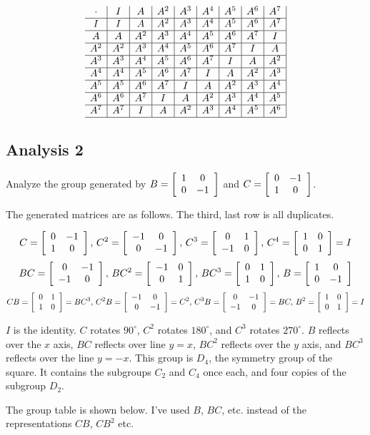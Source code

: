 \documentclass[../gatm.tex]{subfiles}
\begin{document}
$$\begin{array}{c|c|c|c|c|c|c|c|c|}
\cdot & I & A & A^2 & A^3 & A^4 & A^5 & A^6 & A^7 \\ \hline
I & I & A & A^2 & A^3 & A^4 & A^5 & A^6 & A^7 \\ \hline
A & A & A^2 & A^3 & A^4 & A^5 & A^6 & A^7 & I \\ \hline
A^2 & A^2 & A^3 & A^4 & A^5 & A^6 & A^7 & I & A \\ \hline
A^3 & A^3 & A^4 & A^5 & A^6 & A^7 & I & A & A^2 \\ \hline
A^4 & A^4 & A^5 & A^6 & A^7 & I & A & A^2 & A^3 \\ \hline
A^5 & A^5 & A^6 & A^7 & I & A & A^2 & A^3 & A^4 \\ \hline
A^6 & A^6 & A^7 & I & A & A^2 & A^3 & A^4 & A^5 \\ \hline
A^7 & A^7 & I & A & A^2 & A^3 & A^4 & A^5 & A^6 \\ \hline
\end{array}$$

\subsection*{Analysis 2}

Analyze the group generated by $B=\left[\begin{array}{cc} 1 & 0 \\ 0 & -1 \end{array}\right]$ and $C=\left[\begin{array}{cc} 0 & -1 \\ 1 & 0 \end{array}\right]$.

The generated matrices are as follows. The third, last row is all duplicates.

$$C=\left[\begin{array}{cc} 0 & -1 \\ 1 & 0 \end{array}\right],\, C^2=\left[\begin{array}{cc} -1 & 0 \\ 0 & -1 \end{array}\right],\, C^3=\left[\begin{array}{cc} 0 & 1 \\ -1 & 0 \end{array}\right],\, C^4=\left[\begin{array}{cc} 1 & 0 \\ 0 & 1 \end{array}\right]=I$$
$$BC=\left[\begin{array}{cc} 0 & -1 \\ -1 & 0 \end{array}\right],\, BC^2=\left[\begin{array}{cc} -1 & 0 \\ 0 & 1 \end{array}\right],\, BC^3 = \left[\begin{array}{cc} 0 & 1 \\ 1 & 0 \end{array}\right],\, B = \left[\begin{array}{cc} 1 & 0 \\ 0 & -1 \end{array}\right]$$
$$CB=\left[\begin{array}{cc} 0 & 1 \\ 1 & 0 \end{array}\right]=BC^3,\, C^2B=\left[\begin{array}{cc} -1 & 0 \\ 0 & -1 \end{array}\right]=C^2,\, C^3B=\left[\begin{array}{cc} 0 & -1 \\ -1 & 0 \end{array}\right]=BC,\, B^2=\left[\begin{array}{cc} 1 & 0 \\ 0 & 1 \end{array}\right]=I$$

$I$ is the identity. $C$ rotates $90^\circ$, $C^2$ rotates $180^\circ$, and $C^3$ rotates $270^\circ$. $B$ reflects over the $x$ axis, $BC$ reflects over line $y=x$, $BC^2$ reflects over the $y$ axis, and $BC^3$ reflects over the line $y=-x$. This group is $D_4$, the symmetry group of the square. It contains the subgroups $C_2$ and $C_4$ once each, and four copies of the subgroup $D_2$.

The group table is shown below. I've used $B$, $BC$, etc. instead of the representations $CB$, $CB^2$ etc.
\end{document}
